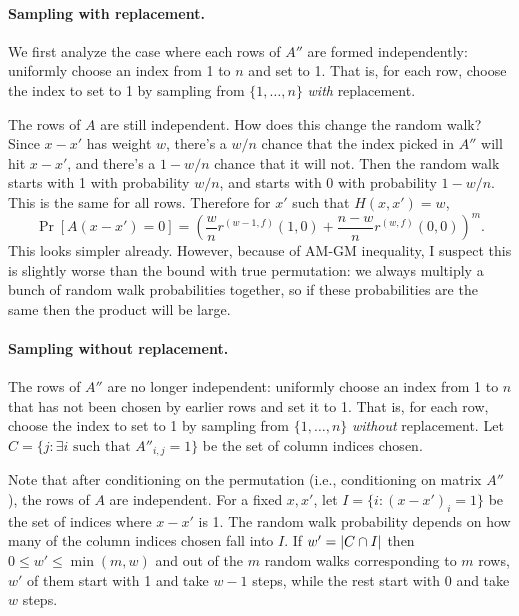 \documentclass[11pt]{article}
\begin{document}
\paragraph{Sampling with replacement.}
We first analyze the case where each rows of $A''$ are formed independently:
uniformly choose an index from 1 to $n$ and set to 1.
That is, for each row, choose the index to set to 1 by sampling from $\{ 1,
\dots, n \}$ \emph{with} replacement.

The rows of $A$ are still independent.
How does this change the random walk?
Since $x - x'$ has weight $w$, there's a $w/n$ chance that the index picked in
$A''$ will hit $x - x'$, and there's a $1 - w/n$ chance that it will not.
Then the random walk starts with 1 with probability $w/n$, and starts with 0
with probability $1-w/n$.
This is the same for all rows.
Therefore for $x'$ such that $H(x, x') = w$,
\begin{equation}
  \Pr[A(x - x') = 0] = \left(\frac{w}{n} r^{(w-1, f)}(1, 0) + \frac{n-w}{n}
    r^{(w, f)}(0, 0)\right)^m.
  \label{eq:k_1_with_replacement}
\end{equation}
This looks simpler already.
However, because of AM-GM inequality, I suspect this is slightly worse than the
bound with true permutation: we always multiply a bunch of random walk
probabilities together, so if these probabilities are the same then the product
will be large.

\paragraph{Sampling without replacement.}
The rows of $A''$ are no longer independent: uniformly choose an index from 1 to
$n$ that has not been chosen by earlier rows and set it to 1.
That is, for each row, choose the index to set to 1 by sampling from $\{ 1,
\dots, n \}$ \emph{without} replacement.
Let $C = \{ j \colon \exists i \text{ such that } A''_{i, j} = 1 \}$ be the set of
column indices chosen.

Note that after conditioning on the permutation (i.e., conditioning on matrix
$A''$), the rows of $A$ are independent.
For a fixed $x, x'$, let $I = \{ i \colon (x - x')_i = 1 \}$ be the set of
indices where $x - x'$ is 1.
The random walk probability depends on how many of the column indices chosen
fall into $I$.
If $w' = \left\lvert C \cap I\right\rvert$ then $0 \leq w' \leq \min(m, w)$ and out of the $m$ random walks
corresponding to $m$ rows, $w'$ of them start with 1 and take $w - 1$ steps,
while the rest start with 0 and take $w$ steps.
\end{document}
